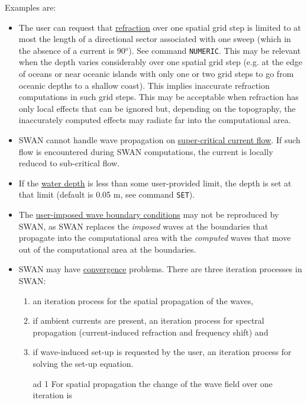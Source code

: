 \documentclass[12pt]{book}
\begin{document}
Examples are:
\begin{itemize}
  \item The user can request that \underline{refraction} over one spatial grid step is limited to at most
        the length of a directional sector associated with one sweep (which in the absence of a current is 90$^o$).
        See command {\tt NUMERIC}. This may be relevant when the depth varies considerably
        over one spatial grid step (e.g. at the edge of oceans or near oceanic islands with only
        one or two grid steps to go from oceanic depths to a shallow coast). This implies
        inaccurate refraction computations in such grid steps. This may be acceptable when
        refraction has only local effects that can be ignored but, depending on the topography,
        the inaccurately computed effects may radiate far into the computational area.
  \item SWAN cannot handle wave propagation on \underline{super-critical current flow}. If such flow is
        encountered during SWAN computations, the current is locally reduced to sub-critical flow.
  \item If the \underline{water depth} is less than some user-provided limit, the depth is set at that limit
        (default is 0.05 m, see command {\tt SET}).
  \item The \underline{user-imposed wave boundary conditions} may not be reproduced by SWAN,
        as SWAN replaces the {\it imposed} waves at the boundaries that
        propagate into the computational area with the {\it computed} waves that move out of the computational
        area at the boundaries.
  \item SWAN may have \underline{convergence} problems. There are three iteration processes in SWAN:
        \begin{enumerate}
           \item an iteration process for the spatial propagation of the waves,
           \item if ambient currents are present, an iteration process for spectral propagation
                 (current-induced refraction and frequency shift) and
           \item if wave-induced set-up is requested by the user, an iteration process for
                 solving the set-up equation.
        \end{enumerate}
        \begin{itemize}
           \item[ad 1] For spatial propagation the change of the wave field over one iteration is

\end{itemize}
\end{itemize}
\end{document}

